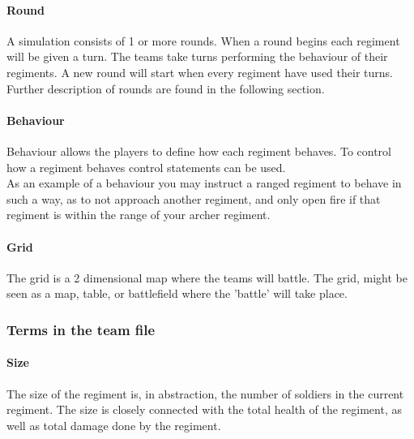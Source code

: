 		\paragraph{Round}
		A simulation consists of 1 or more rounds. When a round begins each regiment will be given a turn.
		The teams take turns performing the behaviour of their regiments. 
		A new round will start when every regiment have used their turns.
		Further description of rounds are found in the following section.

		\paragraph{Behaviour}
		Behaviour allows the players to define how each regiment behaves. 
		To control how a regiment behaves control statements can be used. \\
		As an example of a behaviour you may instruct a ranged regiment to behave in such a way, 
		as to not approach another regiment, and only open fire if that regiment is within the range of your archer regiment.
				
		\paragraph{Grid}
		The grid is a 2 dimensional map where the teams will battle.
		The grid, might be seen as a map, table, or battlefield where the 'battle' will take place. 
																		
		\subsubsection{Terms in the team file }
	
		\paragraph{Size}
		The size of the regiment is, in abstraction, the number of soldiers in the current regiment. 
		The size is closely connected with the total health of the regiment, as well as total damage done by the regiment.

